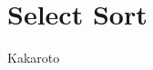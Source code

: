 \documentclass[knowledge.tex]{subfiles}
\begin{document}
    \section{Select Sort}
    Kakaroto
\end{document}
